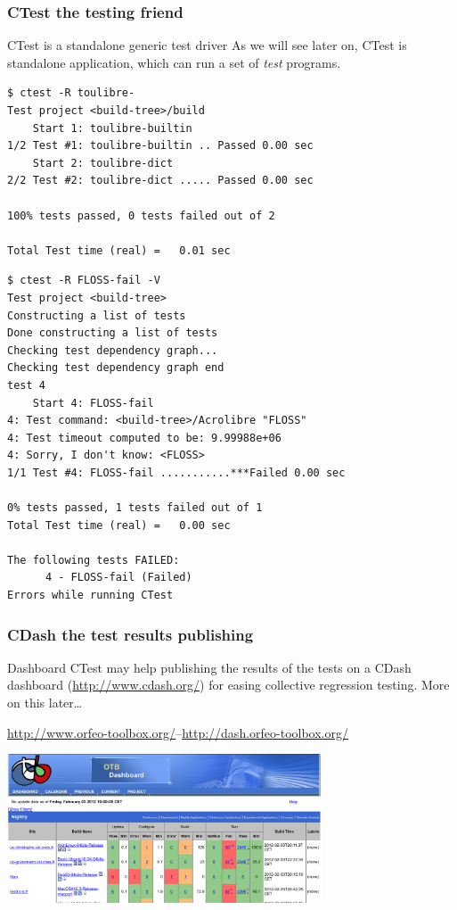 \documentclass[compress,slidestop,table
              ]
               {beamer}
\begin{document}
\begin{frame}[fragile]
\frametitle{CTest the testing friend}
\begin{block}{CTest is a standalone generic test driver}
As we will see later on, CTest is standalone application,
which can run a set of \emph{test} programs.
\end{block}
\vspace*{-0.5cm}
\begin{multicols}{2}
\begin{Verbatim}[commandchars=\\\{\},fontsize=\tiny]
$ ctest -R toulibre-
Test project <build-tree>/build
    Start 1: toulibre-builtin
1/2 Test #1: toulibre-builtin .. Passed 0.00 sec
    Start 2: toulibre-dict
2/2 Test #2: toulibre-dict ..... Passed 0.00 sec

100% tests passed, 0 tests failed out of 2

Total Test time (real) =   0.01 sec
\end{Verbatim}
\columnbreak
\begin{Verbatim}[commandchars=\\\{\},fontsize=\tiny]
$ ctest -R FLOSS-fail -V
Test project <build-tree>
Constructing a list of tests
Done constructing a list of tests
Checking test dependency graph...
Checking test dependency graph end
test 4
    Start 4: FLOSS-fail
4: Test command: <build-tree>/Acrolibre "FLOSS"
4: Test timeout computed to be: 9.99988e+06
4: Sorry, I don't know: <FLOSS>
1/1 Test #4: FLOSS-fail ...........***Failed 0.00 sec

0% tests passed, 1 tests failed out of 1
Total Test time (real) =   0.00 sec

The following tests FAILED:
	  4 - FLOSS-fail (Failed)
Errors while running CTest
\end{Verbatim}
\end{multicols}
\end{frame}

\begin{frame}[fragile]
\frametitle{CDash the test results publishing}
\begin{block}{Dashboard}
CTest may help publishing the results of the tests
on a CDash dashboard (\url{http://www.cdash.org/}) 
for easing collective regression testing.
More on this later\ldots
\end{block}
\begin{center}
{\scriptsize
\url{http://www.orfeo-toolbox.org/}--\url{http://dash.orfeo-toolbox.org/}
}

\includegraphics[width=0.7\textwidth]{OrfeoToolboxDashBoard}
\end{center}
\end{frame}
\end{document}

